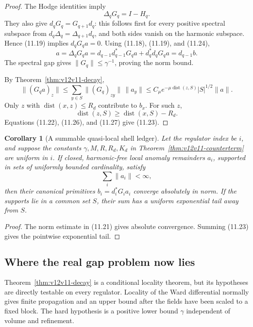 \documentclass[11pt]{article}
\newtheorem{corollary}[theorem]{Corollary}
\theoremstyle{remark}
\begin{document}
\begin{proof}
The Hodge identities imply
\[
 \Delta_qG_q=I-H_q.                                        \tag{11.24}
\]
They also give \(d_qG_q=G_{q+1}d_q\): this follows first for every
positive spectral subspace from
\(d_q\Delta_q=\Delta_{q+1}d_q\), and both sides vanish on the
harmonic subspace.  Hence (11.19) implies \(d_qG_q a=0\).
Using (11.18), (11.19), and (11.24),
\[
 a=\Delta_qG_q a
  =d_{q-1}d_{q-1}^*G_q a+d_q^*d_qG_q a
  =d_{q-1}b.                                                \tag{11.25}
\]
The spectral gap gives \(\|G_q\|\le\gamma^{-1}\), proving the norm
bound.

By Theorem~\ref{thm:v12v11-decay},
\[
 \|(G_qa)_z\|
 \le\sum_{y\in S}\|(G_q)_{zy}\|\,\|a_y\|
 \le C_\mu e^{-\mu\operatorname{dist}(z,S)}
            |S|^{1/2}\|a\|.                                \tag{11.26}
\]
Only \(z\) with \(\operatorname{dist}(x,z)\le R_d\) contribute to
\(b_x\).  For such \(z\),
\[
 \operatorname{dist}(z,S)
 \ge\operatorname{dist}(x,S)-R_d.                           \tag{11.27}
\]
Equations (11.22), (11.26), and (11.27) give (11.23).
\end{proof}

\begin{corollary}[A summable quasi-local shell ledger]
\label{cor:v12v11-shell}
Let the regulator index be \(i\), and suppose the constants
\(\gamma,M,R,R_d,K_d\) in
Theorem~\ref{thm:v12v11-counterterm} are uniform in \(i\).  If closed,
harmonic-free local anomaly remainders \(a_i\), supported in sets of
uniformly bounded cardinality, satisfy
\[
                         \sum_i\|a_i\|<\infty,               \tag{11.28}
\]
then their canonical primitives \(b_i=d_i^*G_i a_i\) converge
absolutely in norm.  If the supports lie in a common set \(S\), their
sum has a uniform exponential tail away from \(S\).
\end{corollary}

\begin{proof}
The norm estimate in (11.21) gives absolute convergence.  Summing
(11.23) gives the pointwise exponential tail.
\end{proof}

\subsection{Where the real gap problem now lies}

Theorem~\ref{thm:v12v11-decay} is a conditional locality theorem, but
its hypotheses are directly testable on every regulator.  Locality
of the Ward differential normally gives finite propagation and an
upper bound after the fields have been scaled to a fixed block.
The hard hypothesis is a positive lower bound \(\gamma\) independent
of volume and refinement.
\end{document}
